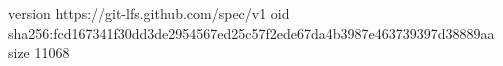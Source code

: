 version https://git-lfs.github.com/spec/v1
oid sha256:fcd167341f30dd3de2954567ed25c57f2ede67da4b3987e463739397d38889aa
size 11068
